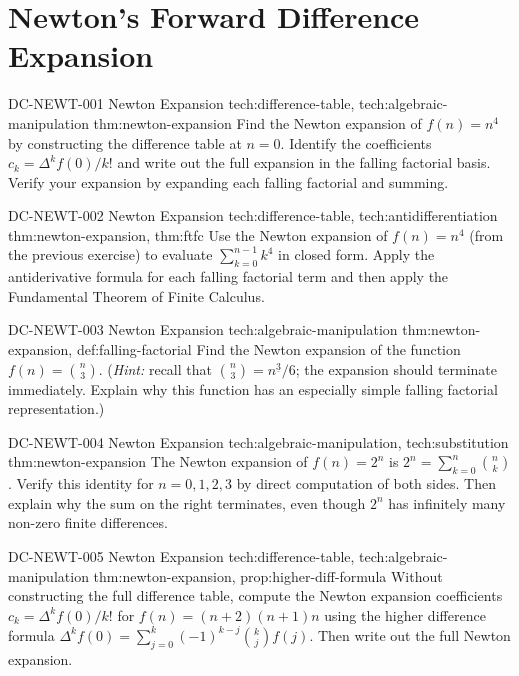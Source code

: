 \section*{Newton's Forward Difference Expansion}

\exstubgenfull
  {DC-NEWT-001}
  {Newton Expansion}
  {tech:difference-table, tech:algebraic-manipulation}
  {thm:newton-expansion}
  {Find the Newton expansion of \(f(n) = n^4\) by constructing the
  difference table at \(n = 0\). Identify the coefficients
  \(c_k = \Delta^k f(0)/k!\) and write out the full expansion in
  the falling factorial basis. Verify your expansion by expanding
  each falling factorial and summing.}

\exstubgenfull
  {DC-NEWT-002}
  {Newton Expansion}
  {tech:difference-table, tech:antidifferentiation}
  {thm:newton-expansion, thm:ftfc}
  {Use the Newton expansion of \(f(n) = n^4\) (from the previous exercise)
  to evaluate \(\displaystyle\sum_{k=0}^{n-1}k^4\) in closed form.
  Apply the antiderivative formula for each falling factorial term and
  then apply the Fundamental Theorem of Finite Calculus.}

\exstubgenfull
  {DC-NEWT-003}
  {Newton Expansion}
  {tech:algebraic-manipulation}
  {thm:newton-expansion, def:falling-factorial}
  {Find the Newton expansion of the function \(f(n) = \binom{n}{3}\).
  (\emph{Hint:} recall that \(\binom{n}{3} = n^{\underline{3}}/6\);
  the expansion should terminate immediately. Explain why this
  function has an especially simple falling factorial representation.)}

\exstubgenfull
  {DC-NEWT-004}
  {Newton Expansion}
  {tech:algebraic-manipulation, tech:substitution}
  {thm:newton-expansion}
  {The Newton expansion of \(f(n) = 2^n\) is
  \(2^n = \displaystyle\sum_{k=0}^{n}\binom{n}{k}\).
  Verify this identity for \(n = 0, 1, 2, 3\) by direct computation
  of both sides. Then explain why the sum on the right terminates,
  even though \(2^n\) has infinitely many non-zero finite differences.}

\exstubgenfull
  {DC-NEWT-005}
  {Newton Expansion}
  {tech:difference-table, tech:algebraic-manipulation}
  {thm:newton-expansion, prop:higher-diff-formula}
  {Without constructing the full difference table, compute the Newton
  expansion coefficients \(c_k = \Delta^k f(0)/k!\) for
  \(f(n) = (n+2)(n+1)n\) using the higher difference formula
  \(\Delta^k f(0) = \sum_{j=0}^{k}(-1)^{k-j}\binom{k}{j}f(j)\).
  Then write out the full Newton expansion.}

